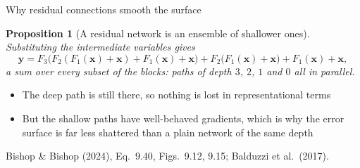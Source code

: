 \documentclass[aspectratio=169, 11pt]{beamer}
\newtheorem{propx}[theorem]{Proposition}
\newcommand{\srcline}[1]{%
  \par\vspace{0.25em}%
  {\scriptsize\color{mcMuted}\hfill #1\par}}
\begin{document}
\begin{frame}{Why residual connections smooth the surface}
  \vspace{-0.15em}
  \begin{propx}[A residual network is an ensemble of shallower ones]\label{th:res}
    \small
    Substituting the intermediate variables gives
    \[
      \mathbf{y} = F_3\big(F_2(F_1(\mathbf{x}) + \mathbf{x}) + F_1(\mathbf{x}) + \mathbf{x}\big)
        + F_2\big(F_1(\mathbf{x}) + \mathbf{x}\big) + F_1(\mathbf{x}) + \mathbf{x} ,
    \]
    a sum over every subset of the blocks: paths of depth $3$, $2$, $1$
    and $0$ all in parallel.
  \end{propx}
  \vspace{0.25em}
  \begin{itemize}\itemsep0.26em
    \item The deep path is still there, so nothing is lost in
          representational terms
    \item But the shallow paths have well-behaved gradients, which is
          why the error surface is far less shattered than a plain
          network of the same depth
  \end{itemize}
  \srcline{Bishop \& Bishop (2024), Eq.~9.40, Figs.~9.12, 9.15;
  Balduzzi et al.\ (2017).}
\end{frame}
\end{document}
